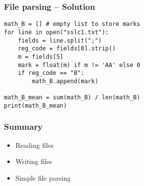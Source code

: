 \documentclass[14pt,compress]{beamer}
\begin{document}
\begin{frame}
  \frametitle{File parsing -- Solution}
  \begin{lstlisting}
math_B = [] # empty list to store marks
for line in open("sslc1.txt"):
    fields = line.split(";")
    reg_code = fields[0].strip()
    m = fields[5]
    mark = float(m) if m != 'AA' else 0
    if reg_code == "B":
        math_B.append(mark)

math_B_mean = sum(math_B) / len(math_B)
print(math_B_mean)
  \end{lstlisting}
\end{frame}

\begin{frame}
  \frametitle{Summary}
  \begin{itemize}
  \item Reading files
  \item Writing files
  \item Simple file parsing
  \end{itemize}
\end{frame}
\end{document}
